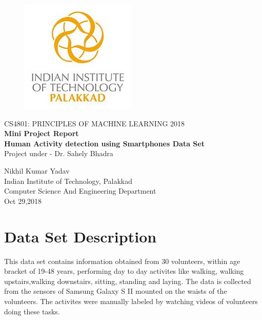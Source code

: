 \documentclass[12pt]{article}
\begin{document}
\begin{titlepage}
	\begin{center}
		\begin{figure}
			\centering
			\includegraphics[height=54mm,width=55mm]{iitpkd.jpg}
		\end{figure}
			\Huge{CS4801: PRINCIPLES OF MACHINE LEARNING 2018}\\ \vspace{.5in}
			\huge{\textbf{Mini Project Report}}\\ \vspace{0.5in}
    \textbf{\Huge{Human Activity detection using Smartphones Data Set }}\\ \vspace{.5in}
    \huge{Project under - Dr. Sahely Bhadra}
    \end{center}
    \vfill
                \begin{large}\begin{center}Nikhil Kumar Yadav\\
		\vspace{15pt}
        Indian Institute of Technology, Palakkad\\
        Computer Science And Engineering Department\\
        Oct 29,2018\end{center}\end{large}
		
             
\end{titlepage}
\newpage
\section{Data Set Description}
This data set contains information obtained from 30 volunteers, within age bracket of 19-48 years, performing day to day activites like walking, walking upstairs,walking downstairs, sitting, standing and laying. The data is collected from the sensors of Samsung Galaxy S II mounted on the waists of the volunteers. The activites were manually labeled by watching videos of volunteers doing these tasks.
\end{document}
